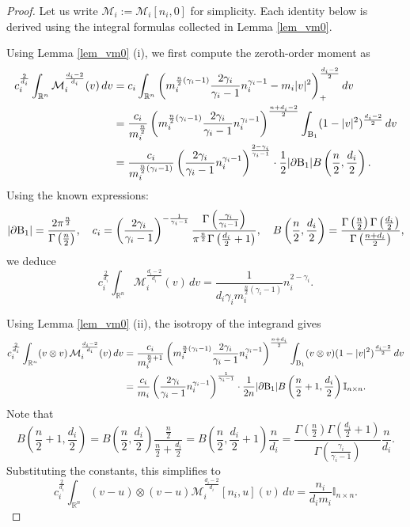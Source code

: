 \documentclass[10pt,reqno]{amsart}
\numberwithin{equation}{section}
\newcommand{\pa}{\partial}
\begin{document}
 \begin{proof}
Let us write $\mathcal{M}_i := \mathcal{M}_i[n_i, 0]$ for simplicity. Each identity below is derived using the integral formulas collected in Lemma \ref{lem_vm0}.

Using Lemma \ref{lem_vm0} (i), we first compute the zeroth-order moment as
\begin{align*}
c_i^{\frac{2}{d_i}} \int_{\mathbb{R}^n} \mathcal{M}_i^{\frac{d_i - 2}{d_i}}(v)\, dv 
&= c_i \int_{\mathbb{R}^n} \left( m_i^{\frac{n}{2}(\gamma_i - 1)} \frac{2\gamma_i}{\gamma_i - 1} n_i^{\gamma_i - 1} - m_i |v|^2 \right)_+^{\frac{d_i - 2}{2}} dv \\
&= \frac{c_i}{m_i^{\frac{n}{2}}} \left( m_i^{\frac{n}{2}(\gamma_i - 1)} \frac{2\gamma_i}{\gamma_i - 1} n_i^{\gamma_i - 1} \right)^{\frac{n + d_i - 2}{2}} \int_{{\rm B}_1} (1 - |v|^2)^{\frac{d_i - 2}{2}}\, dv \\
&= \frac{c_i}{m_i^{\frac{n}{2}(\gamma_i - 1)}} \left( \frac{2\gamma_i}{\gamma_i - 1} n_i^{\gamma_i - 1} \right)^{\frac{2 - \gamma_i}{\gamma_i - 1}} \cdot \frac{1}{2} |\pa {\rm B}_1| B\left( \frac{n}{2}, \frac{d_i}{2} \right).
\end{align*}
Using the known expressions:
\[
|\pa {\rm B}_1| = \frac{2\pi^{\frac{n}{2}}}{\Gamma\left(\frac{n}{2}\right)}, \quad
c_i = \left( \frac{2\gamma_i}{\gamma_i - 1} \right)^{-\frac{1}{\gamma_i - 1}} \frac{\Gamma\left( \frac{\gamma_i}{\gamma_i - 1} \right)}{\pi^{\frac{n}{2}} \Gamma\left( \frac{d_i}{2} + 1 \right)}, \quad B\left( \frac{n}{2}, \frac{d_i}{2} \right) = \frac{\Gamma\left(\frac{n}{2}\right)\Gamma\left(\frac{d_i}{2}\right)}{\Gamma\left(\frac{n + d_i}{2}\right)},
\]
we deduce
\[
c_i^{\frac{2}{d_i}} \int_{\mathbb{R}^n} \mathcal{M}_i^{\frac{d_i - 2}{d_i}}(v)\, dv = \frac{1}{d_i \gamma_i m_i^{\frac{n}{2}(\gamma_i - 1)}} n_i^{2 - \gamma_i}.
\]
 

Using Lemma \ref{lem_vm0} (ii), the isotropy of the integrand gives
\begin{align*}
c_i^{\frac{2}{d_i}} \int_{\mathbb{R}^n} (v \otimes v) \, \mathcal{M}_i^{\frac{d_i - 2}{d_i}}(v)\, dv 
&= \frac{c_i}{m_i^{\frac{n}{2} + 1}} \left( m_i^{\frac{n}{2}(\gamma_i - 1)} \frac{2\gamma_i}{\gamma_i - 1} n_i^{\gamma_i - 1} \right)^{\frac{n + d_i}{2}} \int_{{\rm B}_1} (v \otimes v) (1 - |v|^2)^{\frac{d_i - 2}{2}}\, dv \\
&= \frac{c_i}{m_i} \left( \frac{2\gamma_i}{\gamma_i - 1} n_i^{\gamma_i - 1} \right)^{\frac{1}{\gamma_i - 1}} \cdot \frac{1}{2n} |\pa {\rm B}_1| B\left( \frac{n}{2} + 1, \frac{d_i}{2} \right) \mathbb{I}_{n \times n}.
\end{align*}
Note that 
\[
B\left(\frac n2+1,\frac {d_i}{2}\right)=B\left(\frac n2,\frac {d_i}{2}\right)\frac{\frac n2}{\frac n2+\frac {d_i}{2}}=B\left(\frac n2,\frac {d_i}{2}+1\right)\frac{n}{d_i}=\frac{\Gamma(\frac n2)\Gamma(\frac {d_i}{2}+1)}{\Gamma(\frac{\gamma_i}{\gamma_i-1})}\frac{n}{d_i}.
\]
Substituting the constants, this simplifies to
\[
c_i^{\frac{2}{d_i}} \int_{\mathbb{R}^n} (v - u) \otimes (v - u) \mathcal{M}_i^{\frac{d_i - 2}{d_i}}[n_i, u](v)\, dv = \frac{n_i}{d_i m_i} \mathbb{I}_{n \times n}.
\]


\end{proof}
\end{document}
